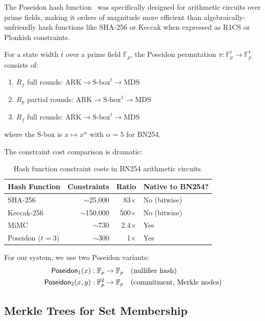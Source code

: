 The Poseidon hash function~\cite{grassi2021poseidon} was specifically designed for arithmetic circuits over prime fields, making it orders of magnitude more efficient than algebraically-unfriendly hash functions like SHA-256 or Keccak when expressed as R1CS or Plonkish constraints.

\begin{definition}
For a state width $t$ over a prime field $\mathbb{F}_p$, the Poseidon permutation $\pi: \mathbb{F}_p^t \to \mathbb{F}_p^t$ consists of:
\begin{enumerate}
    \item $R_f$ full rounds: $\text{ARK} \to \text{S-box}^t \to \text{MDS}$
    \item $R_p$ partial rounds: $\text{ARK} \to \text{S-box}^1 \to \text{MDS}$
    \item $R_f$ full rounds: $\text{ARK} \to \text{S-box}^t \to \text{MDS}$
\end{enumerate}
where the S-box is $x \mapsto x^\alpha$ with $\alpha = 5$ for BN254.
\end{definition}

The constraint cost comparison is dramatic:

\begin{table}[H]
\centering
\caption{Hash function constraint costs in BN254 arithmetic circuits.}
\label{tab:hash-constraints}
\begin{tabular}{|l|r|r|l|}
\hline
\textbf{Hash Function} & \textbf{Constraints} & \textbf{Ratio} & \textbf{Native to BN254?} \\
\hline
SHA-256 & $\sim$25,000 & 83$\times$ & No (bitwise) \\
\hline
Keccak-256 & $\sim$150,000 & 500$\times$ & No (bitwise) \\
\hline
MiMC & $\sim$730 & 2.4$\times$ & Yes \\
\hline
Poseidon ($t=3$) & $\sim$300 & 1$\times$ & Yes \\
\hline
\end{tabular}
\end{table}

For our system, we use two Poseidon variants:
\begin{align}
\mathsf{Poseidon}_1(x) &: \mathbb{F}_p \to \mathbb{F}_p \quad \text{(nullifier hash)} \\
\mathsf{Poseidon}_2(x, y) &: \mathbb{F}_p^2 \to \mathbb{F}_p \quad \text{(commitment, Merkle nodes)}
\end{align}

\subsection{Merkle Trees for Set Membership}

